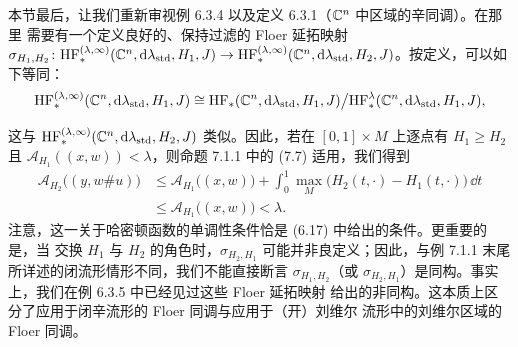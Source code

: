 本节最后，让我们重新审视例 6.3.4 以及定义 6.3.1（$\mathbb{C}^n$ 中区域的辛同调）。在那里
需要有一个定义良好的、保持过滤的 Floer 延拓映射
$\sigma_{H_1,H_2}\colon\mathrm{HF}_*^{(\lambda,\infty)}
(\mathbb{C}^n,\mathrm{d}\lambda_{\mathrm{std}},H_1,J)\to\mathrm{HF}_*^{(\lambda,\infty)}
(\mathbb{C}^n,\mathrm{d}\lambda_{\mathrm{std}},H_2,J)$。按定义，可以如下等同：
\[
  \mathrm{HF}_*^{(\lambda,\infty)}(\mathbb{C}^n,\mathrm{d}\lambda_{\mathrm{std}},H_1,J)
  \cong\mathrm{HF}_*(\mathbb{C}^n,\mathrm{d}\lambda_{\mathrm{std}},H_1,J)
  \big/\mathrm{HF}_*^{\lambda}(\mathbb{C}^n,\mathrm{d}\lambda_{\mathrm{std}},H_1,J),
\]

这与 $\mathrm{HF}_*^{(\lambda,\infty)}(\mathbb{C}^n,\mathrm{d}\lambda_{\mathrm{std}},H_2,J)$
类似。因此，若在 $[0,1]\times M$ 上逐点有 $H_1\ge H_2$ 且
$\mathcal{A}_{H_1}((x,w))<\lambda$，则命题 7.1.1 中的 (7.7) 适用，我们得到
\begin{align*}
  \mathcal{A}_{H_2}\bigl((y,w\#u)\bigr)
  &\le\mathcal{A}_{H_1}\bigl((x,w)\bigr)
    +\int_0^1\max_M\bigl(H_2(t,\cdot)-H_1(t,\cdot)\bigr)\,\dd t\\
  &\le\mathcal{A}_{H_1}\bigl((x,w)\bigr)<\lambda.
\end{align*}
注意，这一关于哈密顿函数的单调性条件恰是 (6.17) 中给出的条件。更重要的是，当
交换 $H_1$ 与 $H_2$ 的角色时，$\sigma_{H_2,H_1}$ 可能并非良定义；因此，与例
7.1.1 末尾所详述的闭流形情形不同，我们不能直接断言 $\sigma_{H_1,H_2}$（或
$\sigma_{H_2,H_1}$）是同构。事实上，我们在例 6.3.5 中已经见过这些 Floer 延拓映射
给出的非同构。这本质上区分了应用于闭辛流形的 Floer 同调与应用于（开）刘维尔
流形中的刘维尔区域的 Floer 同调。

